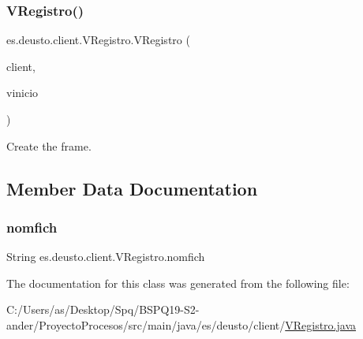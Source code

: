 \subsubsection{\texorpdfstring{VRegistro()}{VRegistro()}}
{\footnotesize\ttfamily es.\+deusto.\+client.\+V\+Registro.\+V\+Registro (\begin{DoxyParamCaption}\item[{\mbox{\hyperlink{classes_1_1deusto_1_1client_1_1_client}{Client}}}]{client,  }\item[{\mbox{\hyperlink{classes_1_1deusto_1_1client_1_1_v_inicio}{V\+Inicio}}}]{vinicio }\end{DoxyParamCaption})}

Create the frame. 

\subsection{Member Data Documentation}
\mbox{\label{classes_1_1deusto_1_1client_1_1_v_registro_aaed4b25a7461d8f707107022b6c9b6e6}} 
\subsubsection{\texorpdfstring{nomfich}{nomfich}}
{\footnotesize\ttfamily String es.\+deusto.\+client.\+V\+Registro.\+nomfich\hspace{0.3cm}{\ttfamily [static]}}



The documentation for this class was generated from the following file\+:\begin{DoxyCompactItemize}
\item 
C\+:/\+Users/as/\+Desktop/\+Spq/\+B\+S\+P\+Q19-\/\+S2-\/ander/\+Proyecto\+Procesos/src/main/java/es/deusto/client/\mbox{\hyperlink{_v_registro_8java}{V\+Registro.\+java}}\end{DoxyCompactItemize}
